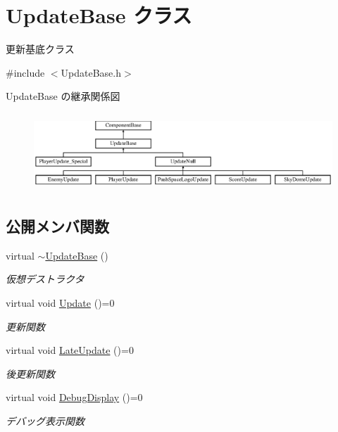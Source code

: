 \hypertarget{class_update_base}{}\section{Update\+Base クラス}
\label{class_update_base}


更新基底クラス  




{\ttfamily \#include $<$Update\+Base.\+h$>$}

Update\+Base の継承関係図\begin{figure}[H]
\begin{center}
\leavevmode
\includegraphics[height=2.966887cm]{class_update_base}
\end{center}
\end{figure}
\subsection*{公開メンバ関数}
\begin{DoxyCompactItemize}
\item 
virtual \mbox{\hyperlink{class_update_base_aad4c3e15c4b67871a0fe13c9f85e5918}{$\sim$\+Update\+Base}} ()
\begin{DoxyCompactList}\small\item\em 仮想デストラクタ \end{DoxyCompactList}\item 
virtual void \mbox{\hyperlink{class_update_base_a9fdc8924001cf6fa89c1f5fa0d867682}{Update}} ()=0
\begin{DoxyCompactList}\small\item\em 更新関数 \end{DoxyCompactList}\item 
virtual void \mbox{\hyperlink{class_update_base_afc4956f78135aed5fc4e4f9991be50b9}{Late\+Update}} ()=0
\begin{DoxyCompactList}\small\item\em 後更新関数 \end{DoxyCompactList}\item 
virtual void \mbox{\hyperlink{class_update_base_a5c63c3c3ef1b85f3701718ec3f7b39e2}{Debug\+Display}} ()=0
\begin{DoxyCompactList}\small\item\em デバッグ表示関数 \end{DoxyCompactList}\end{DoxyCompactItemize}


